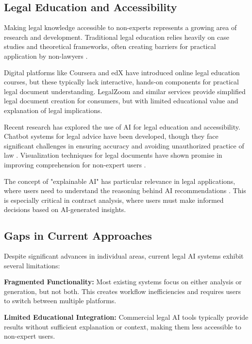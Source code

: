 \subsection{Legal Education and Accessibility}

Making legal knowledge accessible to non-experts represents a growing area of research and development. Traditional legal education relies heavily on case studies and theoretical frameworks, often creating barriers for practical application by non-lawyers \cite{susskind2017future}.

Digital platforms like Coursera and edX have introduced online legal education courses, but these typically lack interactive, hands-on components for practical legal document understanding. LegalZoom and similar services provide simplified legal document creation for consumers, but with limited educational value and explanation of legal implications.

Recent research has explored the use of AI for legal education and accessibility. Chatbot systems for legal advice have been developed, though they face significant challenges in ensuring accuracy and avoiding unauthorized practice of law \cite{passera2013user}. Visualization techniques for legal documents have shown promise in improving comprehension for non-expert users \cite{passera2013user}.

The concept of "explainable AI" has particular relevance in legal applications, where users need to understand the reasoning behind AI recommendations \cite{gunning2017explainable}. This is especially critical in contract analysis, where users must make informed decisions based on AI-generated insights.

\subsection{Gaps in Current Approaches}

Despite significant advances in individual areas, current legal AI systems exhibit several limitations:

\textbf{Fragmented Functionality:} Most existing systems focus on either analysis or generation, but not both. This creates workflow inefficiencies and requires users to switch between multiple platforms.

\textbf{Limited Educational Integration:} Commercial legal AI tools typically provide results without sufficient explanation or context, making them less accessible to non-expert users.

